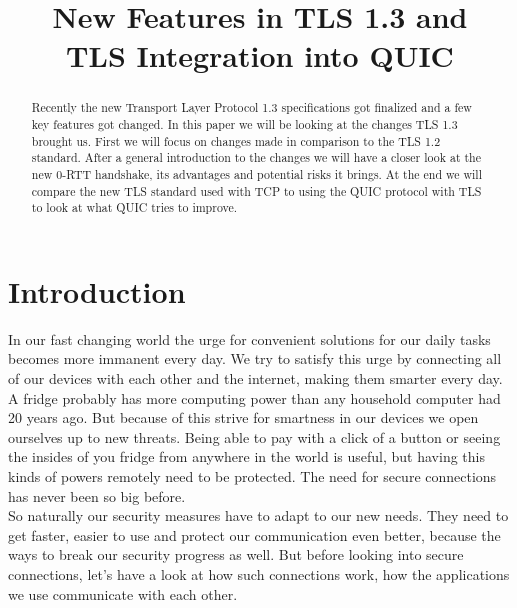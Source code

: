 \documentclass[a4paper,conference]{IEEEtran}
\begin{document}
\title{New Features in TLS 1.3 and\\ TLS Integration into QUIC}

\author{
\and
{}
}



\maketitle

\begin{abstract}
Recently the new Transport Layer Protocol 1.3 specifications got finalized and a few key features got changed.
In this paper we will be looking at the changes TLS 1.3 brought us. First we will focus on changes made in comparison to the TLS 1.2 standard.
After a general introduction to the changes we will have a closer look at the new 0-RTT handshake, its advantages and potential risks it brings.
At the end we will compare the new TLS standard used with TCP to using the QUIC protocol with TLS to look at what QUIC tries to improve.

\end{abstract}


\section{Introduction}
In our fast changing world the urge for convenient solutions for our daily tasks becomes more immanent every day. We try to satisfy this urge by connecting all of our devices with each other and the internet, making them smarter every day. A fridge probably has more computing power than any household computer had 20 years ago. But because of this strive for smartness in our devices we open ourselves up to new threats. Being able to pay with a click of a button or seeing the insides of you fridge from anywhere in the world is useful, but having this kinds of powers remotely need to be protected. The need for secure connections has never been so big before. \\
So naturally our security measures have to adapt to our new needs. They need to get faster, easier to use and protect our communication even better, because the ways to break our security progress as well.
But before looking into secure connections, let's have a look at how such connections work, how the applications we use communicate with each other.
\end{document}
